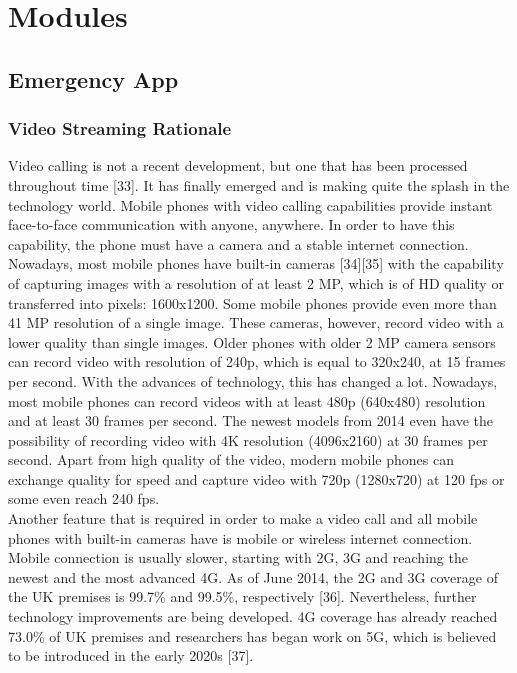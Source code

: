 \documentclass[]{article}
\begin{document}
\pagebreak
\section{Modules}
    \subsection{Emergency App}
    	\subsubsection{Video Streaming Rationale}
    	Video calling is not a recent development, but one that has been processed throughout time [33]. It has finally emerged and is making quite the splash in the technology world. Mobile phones with video calling capabilities provide instant face-to-face communication with anyone, anywhere. In order to have this capability, the phone must have a camera and a stable internet connection.\\
    	
    	Nowadays, most mobile phones have built-in cameras [34][35] with the capability of capturing images with a resolution of at least 2 MP, which is of HD quality or transferred into pixels: 1600x1200. Some mobile phones provide even more than 41 MP resolution of a single image. These cameras, however, record video with a lower quality than single images. Older phones with older 2 MP camera sensors can record video with resolution of 240p, which is equal to 320x240, at 15 frames per second. With the advances of technology, this has changed a lot. Nowadays, most mobile phones can record videos with at least 480p (640x480) resolution and at least 30 frames per second. The newest models from 2014 even have the possibility of recording video with 4K resolution (4096x2160) at 30 frames per second. Apart from high quality of the video, modern mobile phones can exchange quality for speed and capture video with 720p (1280x720) at 120 fps or some even reach 240 fps.\\
    	
    	Another feature that is required in order to make a video call and all mobile phones with built-in cameras have is mobile or wireless internet connection. Mobile connection is usually slower, starting with 2G, 3G and reaching the newest and the most advanced 4G. As of June 2014, the 2G and 3G coverage of the UK premises is 99.7\% and 99.5\%, respectively [36]. Nevertheless, further technology improvements are being developed. 4G coverage has already reached 73.0\% of UK premises and researchers has began work on 5G, which is believed to be introduced in the early 2020s [37].\\
\end{document}
